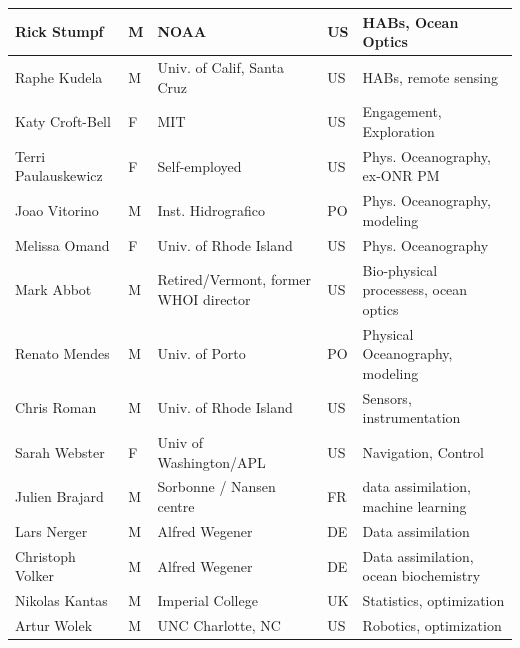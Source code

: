 \begin{table}[H]
{\begin{tabular}{|p{3cm}|p{0.5cm}|p{3.5cm}|p{0.5cm}|p{6cm}|}
\hline
Rick Stumpf              & M   & NOAA                                  & US       & HABs, Ocean Optics                              \\
\hline
Raphe Kudela             & M   & Univ. of Calif, Santa Cruz            & US       & HABs, remote sensing                            \\
\hline
Katy Croft-Bell          & F   & MIT                                   & US       & Engagement, Exploration                         \\
\hline
Terri Paulauskewicz      & F   & Self-employed
                                                       & US       & Phys. Oceanography, ex-ONR PM                       \\
\hline
Joao Vitorino            & M   & Inst. Hidrografico                    & PO       & Phys. Oceanography, modeling                    \\
\hline
Melissa Omand            & F   & Univ. of Rhode Island                 & US       & Phys. Oceanography                              \\
\hline
Mark Abbot               & M   & Retired/Vermont, former WHOI director & US       & Bio-physical processess, ocean optics           \\
\hline
Renato Mendes            & M   & Univ. of Porto                        & PO       & Physical Oceanography, modeling                 \\
\hline
Chris Roman              & M   & Univ. of Rhode Island                 & US       & Sensors, instrumentation                        \\
\hline
Sarah Webster            & F   & Univ of Washington/APL                & US       & Navigation, Control                             \\
\hline
Julien Brajard           & M   & Sorbonne / Nansen centre              & FR       & data assimilation, machine learning             \\
\hline
Lars Nerger              & M   & Alfred Wegener                        & DE       & Data assimilation                               \\
\hline
Christoph Volker         & M   & Alfred Wegener                        & DE       & Data assimilation, ocean biochemistry           \\
\hline
Nikolas Kantas           & M   & Imperial College                      & UK       & Statistics, optimization                        \\
\hline
Artur Wolek              & M   & UNC Charlotte, NC                     & US       & Robotics, optimization                          \\

\end{tabular}}
\end{table}
